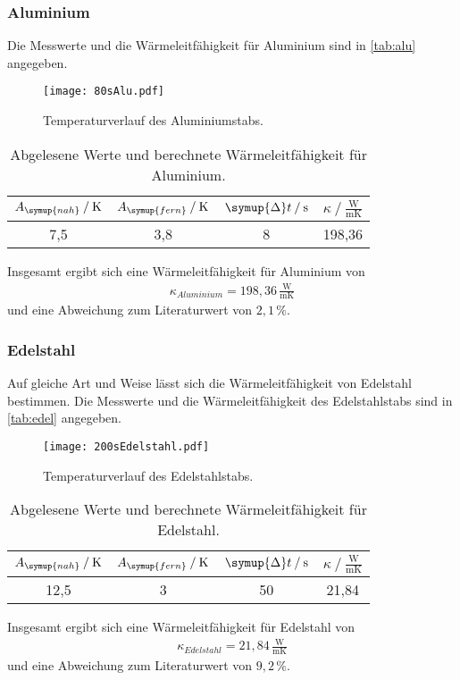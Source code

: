 \subsubsection{Aluminium}
Die Messwerte und die Wärmeleitfähigkeit für Aluminium sind in \autoref{tab:alu} angegeben.
\begin{figure}[h]
  \centering
  \texttt{[image: 80sAlu.pdf]}
  \caption{Temperaturverlauf des Aluminiumstabs.}
  \label{fig:80sAlu}
\end{figure}

\begin{table}[h]
  \centering
  \caption{Abgelesene Werte und berechnete Wärmeleitfähigkeit für Aluminium.}
  \label{tab:alu}
  \begin{tabular}{c c c c}
    \toprule
    $A_{\symup{nah}}\mathbin{/}\si{\kelvin}$ & $A_{\symup{fern}}\mathbin{/}\si{\kelvin}$ & $\symup{\Delta}t\mathbin{/}\si{\second}$ & $\kappa\mathbin{/}\frac{\si{\watt}}{\si{\meter \kelvin}}$ \\
    \midrule
    7,5 & 3,8 & 8 & 198,36\\
    \bottomrule
  \end{tabular}
\end{table}

Insgesamt ergibt sich eine Wärmeleitfähigkeit für Aluminium von
\begin{align*}
  \kappa_{Aluminium} = 198,36\,\frac{\si{\watt}}{\si{\meter \kelvin}}
\end{align*}
und eine Abweichung zum Literaturwert von $2,1\,\%$.

\subsubsection{Edelstahl}
Auf gleiche Art und Weise lässt sich die Wärmeleitfähigkeit von Edelstahl bestimmen. Die Messwerte und die Wärmeleitfähigkeit des Edelstahlstabs sind in \autoref{tab:edel} angegeben.
\begin{figure}[h]
  \centering
  \texttt{[image: 200sEdelstahl.pdf]}
  \caption{Temperaturverlauf des Edelstahlstabs.}
  \label{fig:200sEdelstahl}
\end{figure}

\begin{table}[h]
  \centering
  \caption{Abgelesene Werte und berechnete Wärmeleitfähigkeit für Edelstahl.}
  \label{tab:edel}
  \begin{tabular}{c c c c}
    \toprule
    $A_{\symup{nah}}\mathbin{/}\si{\kelvin}$ & $A_{\symup{fern}}\mathbin{/}\si{\kelvin}$ & $\symup{\Delta}t\mathbin{/}\si{\second}$ & $\kappa\mathbin{/}\frac{\si{\watt}}{\si{\meter \kelvin}}$ \\
    \midrule
    12,5 & 3 & 50 & 21,84\\
    \bottomrule
  \end{tabular}
\end{table}

Insgesamt ergibt sich eine Wärmeleitfähigkeit für Edelstahl von
\begin{align*}
  \kappa_{Edelstahl} = 21,84\,\frac{\si{\watt}}{\si{\meter \kelvin}}
\end{align*}
und eine Abweichung zum Literaturwert von $9,2\,\%$.
